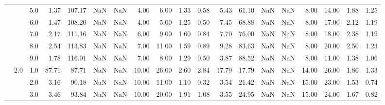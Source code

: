 \begin{tabular}{lllrrrrrrrrrrrrrrrr}
          &     & 5.0  &      1.37 &     107.17 &               NaN &                NaN &  4.00 &   6.00 &             1.33 &                         0.58 &      5.43 &      61.10 &               NaN &                NaN &  8.00 &  14.00 &             1.88 &                         1.25 \\
          &     & 6.0  &      1.47 &     108.20 &               NaN &                NaN &  4.00 &   5.00 &             1.25 &                         0.50 &      7.45 &      68.88 &               NaN &                NaN &  8.00 &  17.00 &             2.12 &                         1.19 \\
          &     & 7.0  &      2.17 &     111.16 &               NaN &                NaN &  6.00 &   9.00 &             1.60 &                         0.84 &      7.70 &      76.00 &               NaN &                NaN &  8.00 &  18.00 &             2.38 &                         1.19 \\
          &     & 8.0  &      2.54 &     113.83 &               NaN &                NaN &  7.00 &  11.00 &             1.59 &                         0.89 &      9.28 &      83.63 &               NaN &                NaN &  8.00 &  20.00 &             2.50 &                         1.23 \\
          &     & 9.0  &      1.78 &     116.01 &               NaN &                NaN &  7.00 &   8.00 &             1.29 &                         0.50 &      3.87 &      88.52 &               NaN &                NaN &  8.00 &  11.00 &             1.38 &                         1.06 \\
          & 2.0 & 1.0  &     87.71 &      87.71 &               NaN &                NaN & 10.00 &  26.00 &             2.60 &                         2.84 &     17.79 &      17.79 &               NaN &                NaN & 14.00 &  26.00 &             1.86 &                         1.33 \\
          &     & 2.0  &      3.16 &      90.18 &               NaN &                NaN & 10.00 &  11.00 &             1.10 &                         0.32 &      3.54 &      21.42 &               NaN &                NaN & 15.00 &  23.00 &             1.53 &                         0.74 \\
          &     & 3.0  &      3.46 &      93.84 &               NaN &                NaN & 10.00 &  20.00 &             1.91 &                         1.08 &      3.55 &      24.95 &               NaN &                NaN & 15.00 &  24.00 &             1.67 &                         0.82 \\

\end{tabular}

